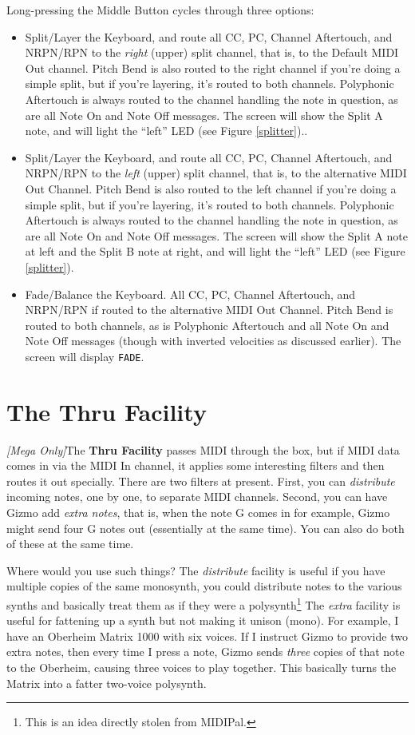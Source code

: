 \documentclass{article}
\begin{document}
Long-pressing the Middle Button cycles through three options:
\begin{itemize}
\item Split/Layer the Keyboard, and route all CC, PC, Channel Aftertouch, and NRPN/RPN to the {\it right} (upper) split channel, that is, to the Default MIDI Out channel.  Pitch Bend is also routed to the right channel if you're doing a simple split, but if you're layering, it's routed to both channels.  Polyphonic Aftertouch is always routed to the channel handling the note in question, as are all Note On and Note Off messages.  The screen will show the Split A note, and will light the ``left'' LED (see Figure \ref{splitter})..
\item Split/Layer the Keyboard, and route all CC, PC, Channel Aftertouch, and NRPN/RPN to the {\it left} (upper) split channel, that is, to the alternative MIDI Out Channel.  Pitch Bend is also routed to the left channel if you're doing a simple split, but if you're layering, it's routed to both channels.  Polyphonic Aftertouch is always routed to the channel handling the note in question, as are all Note On and Note Off messages.  The screen will show the Split A note at left and the Split B note at right, and will light the ``left'' LED (see Figure \ref{splitter}).
\item Fade/Balance the Keyboard.  All CC, PC, Channel Aftertouch, and NRPN/RPN if routed to the alternative MIDI Out Channel.  Pitch Bend is routed to both channels, as is Polyphonic Aftertouch and all Note On and Note Off messages (though with inverted velocities as discussed earlier).  The screen will display \texttt{FADE}.
\end{itemize}

\section{The Thru Facility}
\label{thru}

\textit{[Mega Only]}\qquad The {\bf Thru Facility} passes MIDI through the box, but if MIDI data comes in via the MIDI In channel, it applies some interesting filters and then routes it out specially.  There are two filters at present.  First, you can {\it distribute} incoming notes, one by one, to separate MIDI channels.  Second, you can have Gizmo add {\it extra notes}, that is, when the note G comes in for example, Gizmo might send four G notes out (essentially at the same time).  You can also do both of these at the same time.

Where would you use such things?  The {\it distribute} facility is useful if you have multiple copies of the same monosynth, you could distribute notes to the various synths and basically treat them as if they were a polysynth\footnote{This is an idea directly stolen from MIDIPal.}  The {\it extra} facility is useful for fattening up a synth but not making it unison (mono).  For example, I have an Oberheim Matrix 1000 with six voices.  If I instruct Gizmo to provide two extra notes, then every time I press a note, Gizmo sends {\it three} copies of that note to the Oberheim, causing three voices to play together.  This basically turns the Matrix into a fatter two-voice polysynth.
\end{document}
